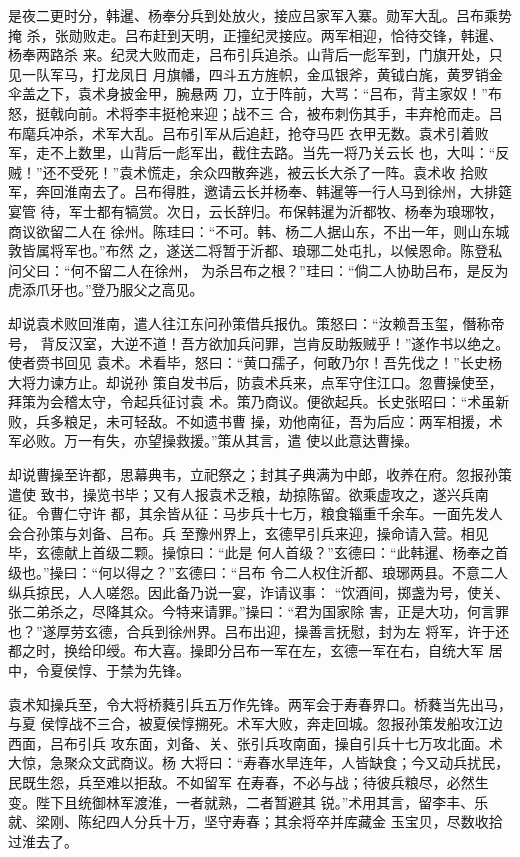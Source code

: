 是夜二更时分，韩暹、杨奉分兵到处放火，接应吕家军入寨。勋军大乱。吕布乘势掩
杀，张勋败走。吕布赶到天明，正撞纪灵接应。两军相迎，恰待交锋，韩暹、杨奉两路杀
来。纪灵大败而走，吕布引兵追杀。山背后一彪军到，门旗开处，只见一队军马，打龙凤日
月旗幡，四斗五方旌帜，金瓜银斧，黄钺白旄，黄罗销金伞盖之下，袁术身披金甲，腕悬两
刀，立于阵前，大骂：“吕布，背主家奴！”布怒，挺戟向前。术将李丰挺枪来迎；战不三
合，被布刺伤其手，丰弃枪而走。吕布麾兵冲杀，术军大乱。吕布引军从后追赶，抢夺马匹
衣甲无数。袁术引着败军，走不上数里，山背后一彪军出，截住去路。当先一将乃关云长
也，大叫：“反贼！”还不受死！”袁术慌走，余众四散奔逃，被云长大杀了一阵。袁术收
拾败军，奔回淮南去了。吕布得胜，邀请云长并杨奉、韩暹等一行人马到徐州，大排筵宴管
待，军士都有犒赏。次日，云长辞归。布保韩暹为沂都牧、杨奉为琅琊牧，商议欲留二人在
徐州。陈珪曰：“不可。韩、杨二人据山东，不出一年，则山东城敦皆属将军也。”布然
之，遂送二将暂于沂都、琅琊二处屯扎，以候恩命。陈登私问父曰：“何不留二人在徐州，
为杀吕布之根？”珪曰：“倘二人协助吕布，是反为虎添爪牙也。”登乃服父之高见。

却说袁术败回淮南，遣人往江东问孙策借兵报仇。策怒曰：“汝赖吾玉玺，僭称帝号，
背反汉室，大逆不道！吾方欲加兵问罪，岂肯反助叛贼乎！”遂作书以绝之。使者赍书回见
袁术。术看毕，怒曰：“黄口孺子，何敢乃尔！吾先伐之！”长史杨大将力谏方止。却说孙
策自发书后，防袁术兵来，点军守住江口。忽曹操使至，拜策为会稽太守，令起兵征讨袁
术。策乃商议。便欲起兵。长史张昭曰：“术虽新败，兵多粮足，未可轻敌。不如遗书曹
操，劝他南征，吾为后应：两军相援，术军必败。万一有失，亦望操救援。”策从其言，遣
使以此意达曹操。

却说曹操至许都，思幕典韦，立祀祭之；封其子典满为中郎，收养在府。忽报孙策遣使
致书，操览书毕；又有人报袁术乏粮，劫掠陈留。欲乘虚攻之，遂兴兵南征。令曹仁守许
都，其余皆从征：马步兵十七万，粮食辎重千余车。一面先发人会合孙策与刘备、吕布。兵
至豫州界上，玄德早引兵来迎，操命请入营。相见毕，玄德献上首级二颗。操惊曰：“此是
何人首级？”玄德曰：“此韩暹、杨奉之首级也。”操曰：“何以得之？”玄德曰：“吕布
令二人权住沂都、琅琊两县。不意二人纵兵掠民，人人嗟怨。因此备乃说一宴，诈请议事：
“饮酒间，掷盏为号，使关、张二弟杀之，尽降其众。今特来请罪。”操曰：“君为国家除
害，正是大功，何言罪也？”遂厚劳玄德，合兵到徐州界。吕布出迎，操善言抚慰，封为左
将军，许于还都之时，换给印绶。布大喜。操即分吕布一军在左，玄德一军在右，自统大军
居中，令夏侯惇、于禁为先锋。

袁术知操兵至，令大将桥蕤引兵五万作先锋。两军会于寿春界口。桥蕤当先出马，与夏
侯惇战不三合，被夏侯惇搠死。术军大败，奔走回城。忽报孙策发船攻江边西面，吕布引兵
攻东面，刘备、关、张引兵攻南面，操自引兵十七万攻北面。术大惊，急聚众文武商议。杨
大将曰：“寿春水旱连年，人皆缺食；今又动兵扰民，民既生怨，兵至难以拒敌。不如留军
在寿春，不必与战；待彼兵粮尽，必然生变。陛下且统御林军渡淮，一者就熟，二者暂避其
锐。”术用其言，留李丰、乐就、梁刚、陈纪四人分兵十万，坚守寿春；其余将卒并库藏金
玉宝贝，尽数收拾过淮去了。

